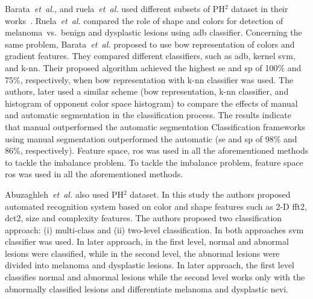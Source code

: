 Barata~\emph{et~al.}\cite{barata2013two,barata2013role}, and ruela~\emph{et~al.}\cite{ruela2013role,ruela2013color} used different subsets of PH$^{2}$ dataset in their works~\cite{mendoncca2013ph}.
Ruela~\emph{et~al.}\cite{ruela2013role,ruela2013color} compared the role of shape and colors for detection of melanoma~vs.~benign and dysplastic lesions using \ac{adb} classifier.
Concerning the same problem, Barata~\emph{et~al.}\cite{barata2013two} proposed to use \ac{bow} representation of colors and gradient features.
They compared different classifiers, such as \ac{adb}, kernel \ac{svm}, and k-\ac{nn}. 
Their proposed algorithm achieved the highest \ac{se} and \ac{sp} of 100\% and 75\%, respectively, when \ac{bow} representation with k-\ac{nn} classifier was used.
The authors, later used a similar scheme (\ac{bow} representation, k-\ac{nn} classifier, and histogram of opponent color space histogram) to compare the effects of manual and automatic segmentation in the classification process.
The results indicate that manual outperformed the automatic segmentation
Classification frameworks using manual segmentation outperformed the automatic (\ac{se} and \ac{sp} of 98\% and 86\%, respectively).
Feature space, \ac{ros} was used in all the aforementioned methods to tackle the imbalance problem.
{\color{red}To tackle the imbalance problem, feature space \ac{ros} was used in all the aforementioned methods.}

Abuzaghleh~\emph{et~al.}\cite{abuzaghleh2014automated} also used PH$^{2}$ dataset.
In this study the authors proposed automated recognition system based on color and shape features such as 2-D \ac{fft2}, \ac{dct2}, size and complexity features.
The authors proposed two classification approach: (i) multi-class and (ii) two-level classification.
In both approaches \ac{svm} classifier was used.
In later approach, in the first level, normal and abnormal lesions were classified, while in the second level, the abnormal lesions were divided into melanoma and dysplastic lesions.
{\color{red}In later approach, the first level classifies normal and abnormal lesions while the second level works only with the abnormally classified lesions and differentiate melanoma and dysplastic nevi.}


